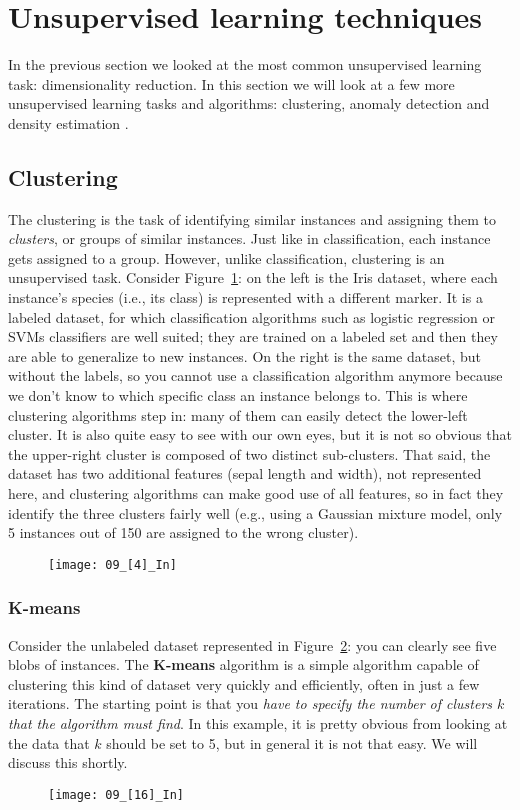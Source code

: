 \section{Unsupervised learning techniques}
In the previous section we looked at the most common unsupervised learning task: dimensionality reduction. In this section we will look at a few more unsupervised learning tasks and algorithms: clustering, anomaly detection and density estimation .
\subsection{Clustering}
The clustering is the task of identifying similar instances and assigning them to \emph{clusters}, or groups of similar instances. Just like in classification, each instance gets assigned to a group. However, unlike classification, clustering is an unsupervised task. Consider Figure~\ref{09_[4]_In}: on the left is the Iris dataset, where each instance's species (i.e., its class) is represented with a different marker. It is a labeled dataset, for which classification algorithms such as logistic regression or SVMs classifiers are well suited; they are trained on a labeled set and then they are able to generalize to new instances. On the right is the same dataset, but without the labels, so you cannot use a classification algorithm anymore because we don't know to which specific class an instance belongs to. This is where clustering algorithms step in: many of them can easily detect the lower-left cluster. It is also quite easy to see with our own eyes, but it is not so obvious that the upper-right cluster is composed of two distinct sub-clusters. That said, the dataset has two additional features (sepal length and width), not represented here, and clustering algorithms can make good use of all features, so in fact they identify the three clusters fairly well (e.g., using a Gaussian mixture model, only 5 instances out of 150 are assigned to the wrong cluster).
\begin{figure}[h!t]
\centering
\texttt{[image: 09\_[4]\_In]}
\caption{}\label{09_[4]_In}
\end{figure}
\subsubsection{K-means}
Consider the unlabeled dataset represented in Figure~\ref{09_[16]_In}: you can clearly see five blobs of instances. The \textbf{K-means} algorithm is a simple algorithm capable of clustering this kind of dataset very quickly and efficiently, often in just a few iterations. The starting point is that you \emph{have to specify the number of clusters $k$ that the algorithm must find}. In this example, it is pretty obvious from looking at the data that $k$ should be set to 5, but in general it is not that easy. We will discuss this shortly.
\begin{figure}[h!t]
\centering
\texttt{[image: 09\_[16]\_In]}
\caption{}\label{09_[16]_In}
\end{figure}

